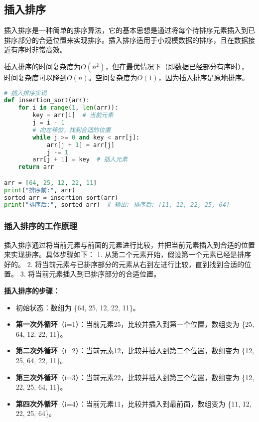 \documentclass{article}
\begin{document}
\subsection{插入排序}
插入排序是一种简单的排序算法，它的基本思想是通过将每个待排序元素插入到已排序部分的合适位置来实现排序。插入排序适用于小规模数据的排序，且在数据接近有序时非常高效。

插入排序的时间复杂度为$O(n^2)$，但在最优情况下（即数据已经部分有序时），时间复杂度可以降到$O(n)$。空间复杂度为$O(1)$，因为插入排序是原地排序。

\begin{lstlisting}[language=Python,caption=插入排序实现]
# 插入排序实现
def insertion_sort(arr):
    for i in range(1, len(arr)):
        key = arr[i]  # 当前元素
        j = i - 1
        # 向左移位，找到合适的位置
        while j >= 0 and key < arr[j]:
            arr[j + 1] = arr[j]
            j -= 1
        arr[j + 1] = key  # 插入元素
    return arr

arr = [64, 25, 12, 22, 11]
print("排序前:", arr)
sorted_arr = insertion_sort(arr)
print("排序后:", sorted_arr)  # 输出: 排序后: [11, 12, 22, 25, 64]
\end{lstlisting}

\subsubsection{插入排序的工作原理}
插入排序通过将当前元素与前面的元素进行比较，并把当前元素插入到合适的位置来实现排序。具体步骤如下：
1. 从第二个元素开始，假设第一个元素已经是排序好的。
2. 将当前元素与已排序部分的元素从右到左进行比较，直到找到合适的位置。
3. 将当前元素插入到已排序部分的合适位置。

\noindent
\textbf{插入排序的步骤：}
\begin{itemize}
    \item 初始状态：数组为 \{64, 25, 12, 22, 11\}。
    \item \textbf{第一次外循环}（i=1）：当前元素25，比较并插入到第一个位置，数组变为 \{25, 64, 12, 22, 11\}。
    \item \textbf{第二次外循环}（i=2）：当前元素12，比较并插入到第二个位置，数组变为 \{12, 25, 64, 22, 11\}。
    \item \textbf{第三次外循环}（i=3）：当前元素22，比较并插入到第三个位置，数组变为 \{12, 22, 25, 64, 11\}。
    \item \textbf{第四次外循环}（i=4）：当前元素11，比较并插入到最前面，数组变为 \{11, 12, 22, 25, 64\}。
\end{itemize}
\end{document}
